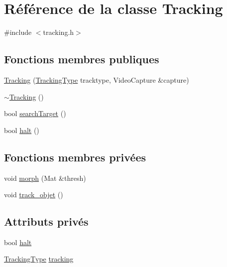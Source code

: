 \hypertarget{classTracking}{\section{Référence de la classe Tracking}
\label{classTracking}
}


{\ttfamily \#include $<$tracking.\-h$>$}

\subsection*{Fonctions membres publiques}
\begin{DoxyCompactItemize}
\item 
\hyperlink{classTracking_ac35bb489c0b55abac393ce129678450a}{Tracking} (\hyperlink{tracking_8h_a97602aa1ed0462d292d2e0407c75ad1d}{Tracking\-Type} tracktype, Video\-Capture \&capture)
\item 
\hyperlink{classTracking_a1c57405d9a91d752d8e8328025004911}{$\sim$\-Tracking} ()
\item 
bool \hyperlink{classTracking_ade3c4f2f36044357a4c7f1d46664544a}{search\-Target} ()
\item 
bool \hyperlink{classTracking_ab9958f0cc01bbffe6d5a7dbecd38fdd2}{halt} ()
\end{DoxyCompactItemize}
\subsection*{Fonctions membres privées}
\begin{DoxyCompactItemize}
\item 
void \hyperlink{classTracking_ac5775bd26c023e6857c87f2d0456aa74}{morph} (Mat \&thresh)
\item 
void \hyperlink{classTracking_aad61fd64840f61edfbeaf55818882fa2}{track\-\_\-objet} ()
\end{DoxyCompactItemize}
\subsection*{Attributs privés}
\begin{DoxyCompactItemize}
\item 
bool \hyperlink{classTracking_a48f10566a108662402396857d9c33e6b}{halt}
\item 
\hyperlink{tracking_8h_a97602aa1ed0462d292d2e0407c75ad1d}{Tracking\-Type} \hyperlink{classTracking_a3eba07f069b521e4ea79c9c7e7933af0}{tracking}
\end{DoxyCompactItemize}


